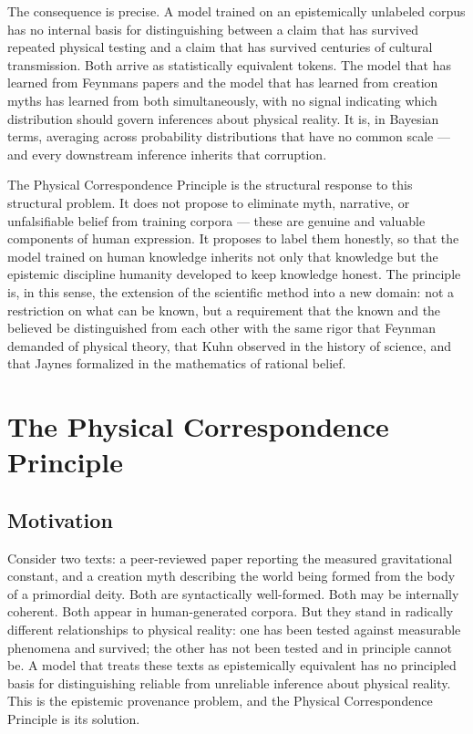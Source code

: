 \documentclass[12pt]{article}
\begin{document}
The consequence is precise. A model trained on an epistemically
unlabeled corpus has no internal basis for distinguishing between a
claim that has survived repeated physical testing and a claim that has
survived centuries of cultural transmission. Both arrive as
statistically equivalent tokens. The model that has learned from
Feynman\textquotesingle s papers and the model that has learned from
creation myths has learned from both simultaneously, with no signal
indicating which distribution should govern inferences about physical
reality. It is, in Bayesian terms, averaging across probability
distributions that have no common scale --- and every downstream
inference inherits that corruption.

The Physical Correspondence Principle is the structural response to this
structural problem. It does not propose to eliminate myth, narrative, or
unfalsifiable belief from training corpora --- these are genuine and
valuable components of human expression. It proposes to label them
honestly, so that the model trained on human knowledge inherits not only
that knowledge but the epistemic discipline humanity developed to keep
knowledge honest. The principle is, in this sense, the extension of the
scientific method into a new domain: not a restriction on what can be
known, but a requirement that the known and the believed be
distinguished from each other with the same rigor that Feynman demanded
of physical theory, that Kuhn observed in the history of science, and
that Jaynes formalized in the mathematics of rational belief.

\section{The Physical Correspondence Principle}\label{the-physical-correspondence-principle}

\subsection{Motivation}\label{motivation}

Consider two texts: a peer-reviewed paper reporting the measured
gravitational constant, and a creation myth describing the world being
formed from the body of a primordial deity. Both are syntactically
well-formed. Both may be internally coherent. Both appear in
human-generated corpora. But they stand in radically different
relationships to physical reality: one has been tested against
measurable phenomena and survived; the other has not been tested and in
principle cannot be. A model that treats these texts as epistemically
equivalent has no principled basis for distinguishing reliable from
unreliable inference about physical reality. This is the epistemic
provenance problem, and the Physical Correspondence Principle is its
solution.
\end{document}
